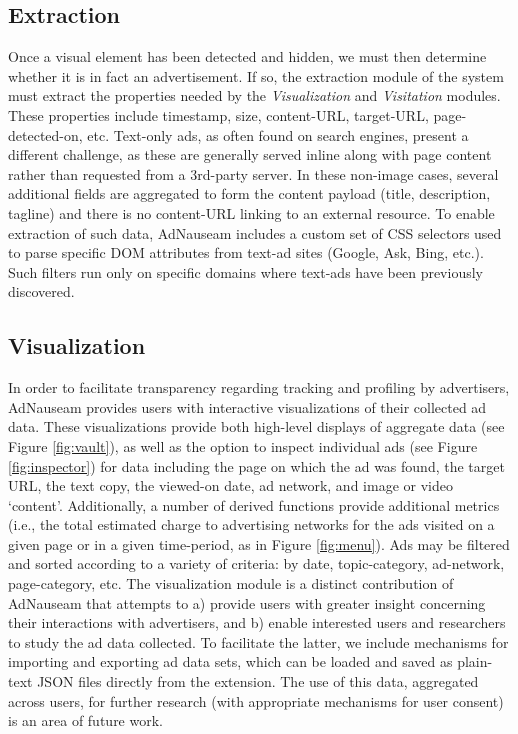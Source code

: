 \documentclass[conference]{IEEEtran}
\begin{document}
\subsection{Extraction}

Once a visual element has been detected and hidden, we must then determine whether it is in fact an advertisement. If so, the extraction module of the system must extract the properties needed by the \emph{Visualization} and \emph{Visitation} modules. These properties include timestamp, size, content-URL, target-URL, page-detected-on, etc. Text-only ads, as often found on search engines, present a different challenge, as these are generally served inline along with page content rather than requested from a 3rd-party server. In these non-image cases, several additional fields are aggregated to form the content payload (title, description, tagline) and there is no content-URL linking to an external resource. To enable extraction of such data, AdNauseam includes a custom set of CSS selectors used to parse specific DOM attributes from text-ad sites (Google, Ask, Bing, etc.). Such filters run only on specific domains where text-ads have been previously discovered.


\subsection{Visualization}

In order to facilitate transparency regarding tracking and profiling by advertisers, AdNauseam provides users with interactive visualizations of their collected ad data. These visualizations provide both high-level displays of aggregate data (see Figure \ref{fig:vault}), as well as the option to inspect individual ads (see Figure \ref{fig:inspector}) for data including the page on which the ad was found, the target URL, the text copy, the viewed-on date, ad network, and image or video ‘content’. Additionally, a number of derived functions provide additional metrics (i.e., the total estimated charge to advertising networks for the ads visited on a given page or in a given time-period, as in Figure \ref{fig:menu}). Ads may be filtered and sorted according to a variety of criteria: by date, topic-category, ad-network, page-category, etc. The visualization module is a distinct contribution of AdNauseam that attempts to a) provide users with greater insight concerning their interactions with advertisers, and b) enable interested users and researchers to study the ad data collected. To facilitate the latter, we include mechanisms for importing and exporting ad data sets, which can be loaded and saved as plain-text JSON files directly from the extension. The use of this data, aggregated across users, for further research (with appropriate mechanisms for user consent) is an area of future work.
\end{document}
